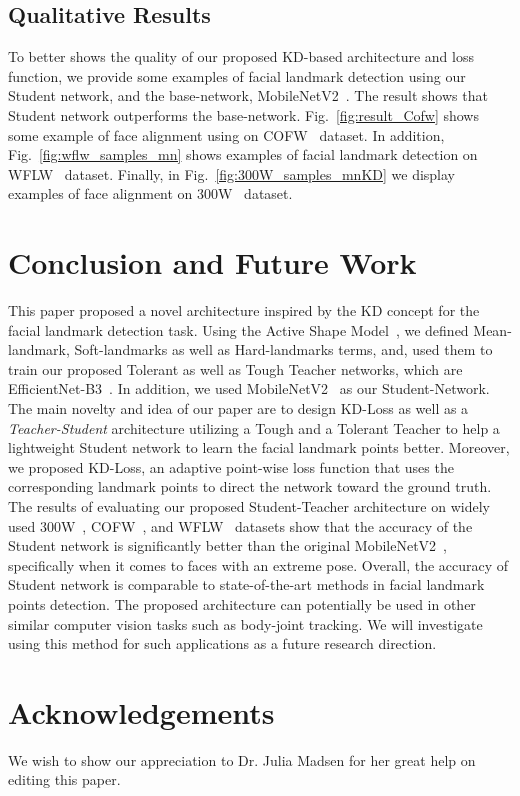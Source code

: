 \documentclass[times,twocolumn,final,authoryear]{elsarticle}
\begin{document}
 \subsection{Qualitative Results} \label{sec:qualitative}
To better shows the quality of our proposed KD-based architecture and loss function, we provide some examples of facial landmark detection using our Student network, and the base-network, MobileNetV2~\cite{sandler2018MobileNetV2}. The result shows that Student network outperforms the base-network. Fig.~\ref{fig:result_Cofw} shows some example of face alignment using on COFW~\cite{burgos2013robust} dataset. In addition, Fig.~\ref{fig:wflw_samples_mn} shows examples of facial landmark detection on WFLW~\cite{wu2018look} dataset. Finally, in Fig.~\ref{fig:300W_samples_mnKD} we display examples of face alignment on 300W~\cite{sagonas2013300} dataset. 


\section{Conclusion and Future Work}
\label{sec:conclusion}
This paper proposed a novel architecture inspired by the KD concept for the facial landmark detection task. Using the Active Shape Model~\cite{cootes2000introduction}, we defined Mean-landmark, Soft-landmarks as well as Hard-landmarks terms, and, used them to train our proposed Tolerant as well as Tough Teacher networks, which are EfficientNet-B3~\cite{tan2019efficientnet}. In addition, we used MobileNetV2~\cite{sandler2018MobileNetV2} as our Student-Network. The main novelty and idea of our paper are to design KD-Loss as well as a \textit{Teacher-Student} architecture utilizing a Tough and a Tolerant Teacher to help a lightweight Student network to learn the facial landmark points better. Moreover, we proposed KD-Loss, an adaptive point-wise loss function that uses the corresponding landmark points to direct the network toward the ground truth. The results of evaluating our proposed Student-Teacher architecture on widely used 300W~\cite{sagonas2013300}, COFW~\cite{burgos2013robust}, and WFLW~\cite{wu2018look} datasets show that the accuracy of the Student network is significantly better than the original MobileNetV2~\cite{sandler2018MobileNetV2}, specifically when it comes to faces with an extreme pose. Overall, the accuracy of Student network is comparable to state-of-the-art methods in facial landmark points detection. The proposed architecture can potentially be used in other similar computer vision tasks such as body-joint tracking. We will investigate using this method for such applications as a future research direction.
\section{Acknowledgements}
We wish to show our appreciation to Dr. Julia Madsen for her great help on editing this paper.



\end{document}
